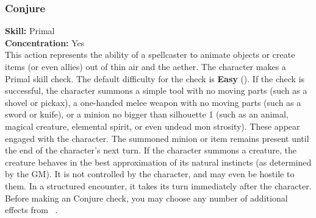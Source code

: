 \subsubsection{Conjure}
\textbf{Skill:} Primal\\
\textbf{Concentration:} Yes\\
This action represents the ability of a spellcaster to animate objects or create
items (or even allies) out of thin air and the aether. The character makes a Primal
skill check. The default difficulty for the check is \textbf{Easy} (\difficulty). If the
check is successful, the character summons a simple tool with no moving parts (such
as a shovel or pickax), a one-handed melee weapon with no moving parts (such as a
sword or knife), or a minion no bigger than silhouette 1 (such as an animal, magical
creature, elemental spirit, or even undead mon strosity). These appear engaged with
the character. The summoned minion or item remains present until the end of the
character's next turn. If the character summons a creature, the creature behaves
in the best approximation of its natural instincts (as determined by the GM). It
is not controlled by the character, and may even be hostile to them. In a structured
encounter, it takes its turn immediately after the character. Before making an
Conjure check, you may choose any number of additional effects from
~.
